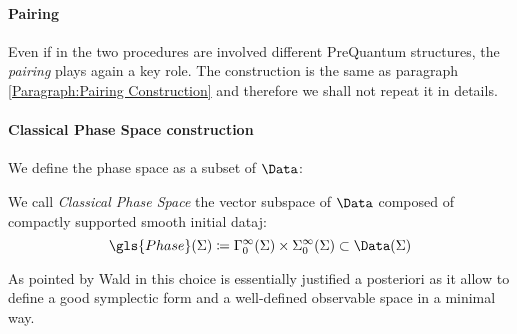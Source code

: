 \documentclass[Main]{subfiles}
\begin{document}
		\paragraph{Pairing}
		Even if in the two procedures are involved different PreQuantum structures, the \emph{pairing} plays again a key role.
		The construction is the same as paragraph \ref{Paragraph:Pairing Construction} and therefore we shall not repeat it in details.

		\paragraph{Classical Phase Space construction}
			We define the phase space as a subset of $\Data$:
			\begin{definition}
				We call \emph{Classical Phase Space} the vector subspace of $\Data$ composed of compactly supported smooth initial dataj:
				\begin{displaymath}
					\gls{Phase}(\Sigma) \coloneqq \Gamma_0^\infty(\Sigma) \times \Sigma_0^\infty (\Sigma) \subset \Data(\Sigma)			
				\end{displaymath}				
			\end{definition}			
			As pointed by Wald in \cite{Wald1994} this choice is essentially justified a posteriori as it allow to define a good symplectic form and a well-defined observable space in a minimal way.
			
\end{document}
